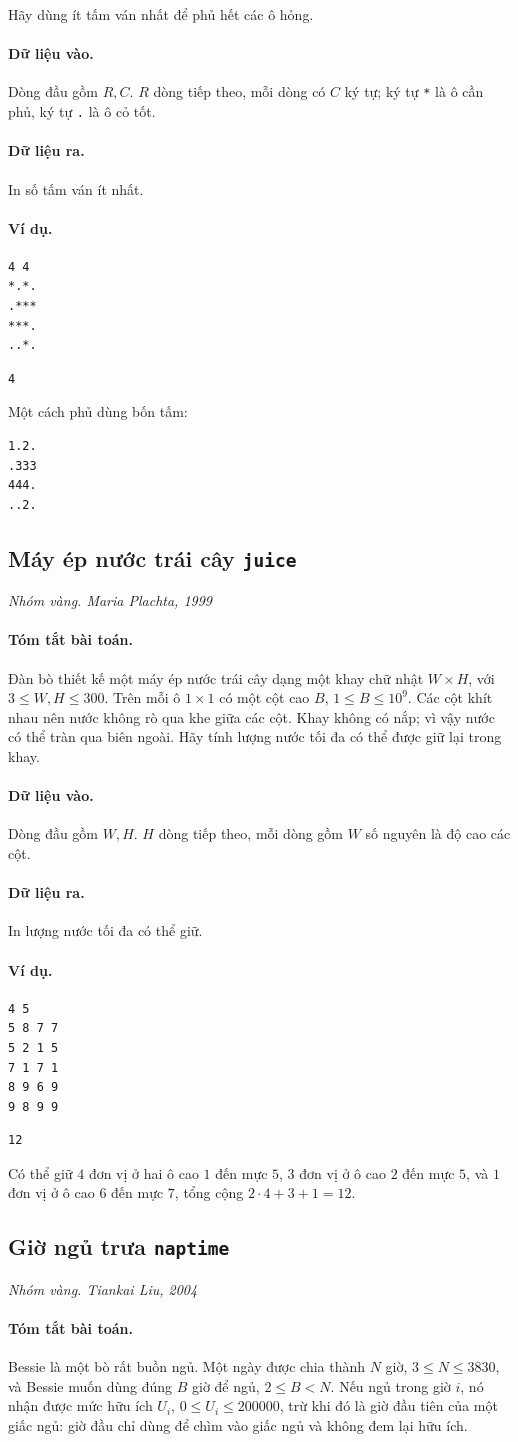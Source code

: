 \documentclass[11pt]{article}
\newcommand{\problem}[4]{%
  \subsection[#1 (#2)]{#1 \hfill {\normalsize\texttt{#2}}}%
  \noindent\textit{#3. #4}\par\smallskip
}
\newcommand{\iosec}[1]{\paragraph{#1}}
\begin{document}
Hãy dùng ít tấm ván nhất để phủ hết các ô hỏng.

\iosec{Dữ liệu vào.}
Dòng đầu gồm \(R,C\). \(R\) dòng tiếp theo, mỗi dòng có \(C\) ký tự; ký tự
\texttt{*} là ô cần phủ, ký tự \texttt{.} là ô cỏ tốt.

\iosec{Dữ liệu ra.}
In số tấm ván ít nhất.

\iosec{Ví dụ.}
\begin{verbatim}
4 4
*.*.
.***
***.
..*.
\end{verbatim}

\begin{verbatim}
4
\end{verbatim}

Một cách phủ dùng bốn tấm:
\begin{verbatim}
1.2.
.333
444.
..2.
\end{verbatim}

\problem{Máy ép nước trái cây}{juice}{Nhóm vàng}{Maria Plachta, 1999}

\iosec{Tóm tắt bài toán.}
Đàn bò thiết kế một máy ép nước trái cây dạng một khay chữ nhật \(W\times H\),
với \(3\le W,H\le 300\). Trên mỗi ô \(1\times1\) có một cột cao \(B\),
\(1\le B\le 10^9\). Các cột khít nhau nên nước không rò qua khe giữa các cột.
Khay không có nắp; vì vậy nước có thể tràn qua biên ngoài. Hãy tính lượng
nước tối đa có thể được giữ lại trong khay.

\iosec{Dữ liệu vào.}
Dòng đầu gồm \(W,H\). \(H\) dòng tiếp theo, mỗi dòng gồm \(W\) số nguyên là độ
cao các cột.

\iosec{Dữ liệu ra.}
In lượng nước tối đa có thể giữ.

\iosec{Ví dụ.}
\begin{verbatim}
4 5
5 8 7 7
5 2 1 5
7 1 7 1
8 9 6 9
9 8 9 9
\end{verbatim}

\begin{verbatim}
12
\end{verbatim}

Có thể giữ \(4\) đơn vị ở hai ô cao \(1\) đến mực \(5\), \(3\) đơn vị ở ô cao
\(2\) đến mực \(5\), và \(1\) đơn vị ở ô cao \(6\) đến mực \(7\), tổng cộng
\(2\cdot4+3+1=12\).

\problem{Giờ ngủ trưa}{naptime}{Nhóm vàng}{Tiankai Liu, 2004}

\iosec{Tóm tắt bài toán.}
Bessie là một bò rất buồn ngủ. Một ngày được chia thành \(N\) giờ,
\(3\le N\le 3830\), và Bessie muốn dùng đúng \(B\) giờ để ngủ,
\(2\le B<N\). Nếu ngủ trong giờ \(i\), nó nhận được mức hữu ích
\(U_i\), \(0\le U_i\le 200000\), trừ khi đó là giờ đầu tiên của một giấc ngủ:
giờ đầu chỉ dùng để chìm vào giấc ngủ và không đem lại hữu ích.
\end{document}
